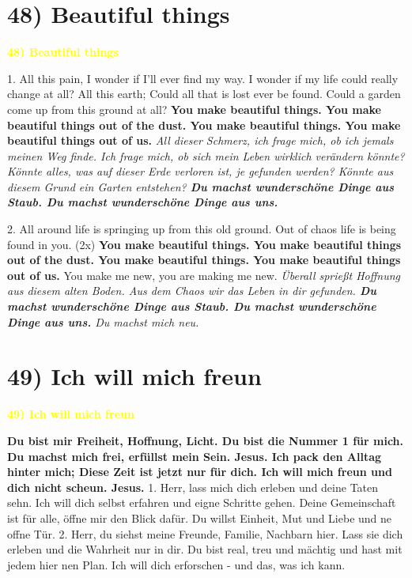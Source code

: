 \documentclass[xcolor=dvipsnames]{beamer}
\newcommand{\songtitle}[1]{\textcolor{yellow}{\textbf{#1}\vspace{0.5em}}}
\newcommand{\z}{\vspace{1em}}
\newcommand{\zh}{\vspace{0.5em}}
\newcommand{\refr}[1]{\textbf{#1}}
\newcommand{\deutschu}[1]{\textcolor{OliveGreen}{\footnotesize{\textit{#1}}}}
\newcommand{\aut}[1]{\flushright{\textcolor{yellow}{\textit{\footnotesize{#1}}\hspace*{1cm}}}}
\newcommand{\songA}[2]{
\section{#1) #2}
\begin{frame1}
\label{#1}\songtitle{#1) #2}}
\begin{document}
\songA{48}{Beautiful things}

1. All this pain, I wonder if I'll ever find my way.
I wonder if my life could really change at all?
All this earth; Could all that is lost ever be found.
Could a garden come up from this ground at all?
\z
\refr{You make beautiful things.
You make beautiful things out of the dust.
You make beautiful things.
You make beautiful things out of us.}
\z
\deutschu{All dieser Schmerz, ich frage mich, ob ich jemals meinen Weg finde.
Ich frage mich, ob sich mein Leben wirklich verändern könnte?
Könnte alles, was auf dieser Erde verloren ist, je gefunden werden?
Könnte aus diesem Grund ein Garten entstehen?
\zh
\refr{Du machst wunderschöne Dinge aus Staub.
Du machst wunderschöne Dinge aus uns.}
}

\end{frame1}
\begin{frame1}

2. All around life is springing up from this old ground.
Out of chaos life is being found in you. (2x)
\z
\refr{You make beautiful things.
You make beautiful things out of the dust.
You make beautiful things.
You make beautiful things out of us.}
\z
You make me new, you are making me new.
\z
\deutschu{Überall sprießt Hoffnung aus diesem alten Boden.
Aus dem Chaos wir das Leben in dir gefunden.
\zh
\refr{Du machst wunderschöne Dinge aus Staub.
Du machst wunderschöne Dinge aus uns.}
\zh
Du machst mich neu.
}

\aut{Lisa \& Michael Gungor, 2009}
\end{frame1}

\songA{49}{Ich will mich freun}

\refr{Du bist mir Freiheit, Hoffnung, Licht. 
Du bist die Nummer 1 für mich.
Du machst mich frei, erfüllst mein Sein. Jesus.
Ich pack den Alltag hinter mich; Diese Zeit ist jetzt nur für dich.
Ich will mich freun und dich nicht scheun. Jesus.}
\z
1. Herr, lass mich dich erleben und deine Taten sehn.
Ich will dich selbst erfahren und eigne Schritte gehen.
Deine Gemeinschaft ist für alle, öffne mir den Blick dafür. 
Du willst Einheit, Mut und Liebe und ne offne Tür.
\z
2. Herr, du siehst meine Freunde, Familie, Nachbarn hier.
Lass sie dich erleben und die Wahrheit nur in dir.
Du bist real, treu und mächtig und hast mit jedem hier nen Plan.
Ich will dich erforschen - und das, was ich kann.

\aut{Lea Schmidt, 2013}
\end{frame1}
\end{document}

